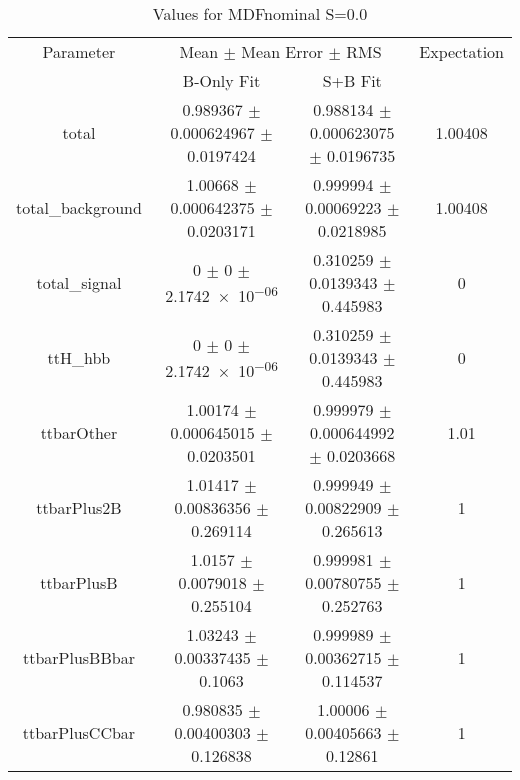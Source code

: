 \begin{table}
\centering
\caption{Values for MDFnominal S=0.0}
\begin{tabular}{cccc}
\toprule
Parameter & \multicolumn{2}{c}{Mean $\pm$ Mean Error $\pm$ RMS} & Expectation\\
 & B-Only Fit & S+B Fit & \\
\midrule
total & \num{0.989367} $\pm$ \num{0.000624967} $\pm$ \num{0.0197424} & \num{0.988134} $\pm$ \num{0.000623075} $\pm$ \num{0.0196735} & \num{1.00408}\\
total\_background & \num{1.00668} $\pm$ \num{0.000642375} $\pm$ \num{0.0203171} & \num{0.999994} $\pm$ \num{0.00069223} $\pm$ \num{0.0218985} & \num{1.00408}\\
total\_signal & \num{0} $\pm$ \num{0} $\pm$ \num{2.1742e-06} & \num{0.310259} $\pm$ \num{0.0139343} $\pm$ \num{0.445983} & \num{0}\\
ttH\_hbb & \num{0} $\pm$ \num{0} $\pm$ \num{2.1742e-06} & \num{0.310259} $\pm$ \num{0.0139343} $\pm$ \num{0.445983} & \num{0}\\
ttbarOther & \num{1.00174} $\pm$ \num{0.000645015} $\pm$ \num{0.0203501} & \num{0.999979} $\pm$ \num{0.000644992} $\pm$ \num{0.0203668} & \num{1.01}\\
ttbarPlus2B & \num{1.01417} $\pm$ \num{0.00836356} $\pm$ \num{0.269114} & \num{0.999949} $\pm$ \num{0.00822909} $\pm$ \num{0.265613} & \num{1}\\
ttbarPlusB & \num{1.0157} $\pm$ \num{0.0079018} $\pm$ \num{0.255104} & \num{0.999981} $\pm$ \num{0.00780755} $\pm$ \num{0.252763} & \num{1}\\
ttbarPlusBBbar & \num{1.03243} $\pm$ \num{0.00337435} $\pm$ \num{0.1063} & \num{0.999989} $\pm$ \num{0.00362715} $\pm$ \num{0.114537} & \num{1}\\
ttbarPlusCCbar & \num{0.980835} $\pm$ \num{0.00400303} $\pm$ \num{0.126838} & \num{1.00006} $\pm$ \num{0.00405663} $\pm$ \num{0.12861} & \num{1}\\
\bottomrule
\end{tabular}
\end{table}